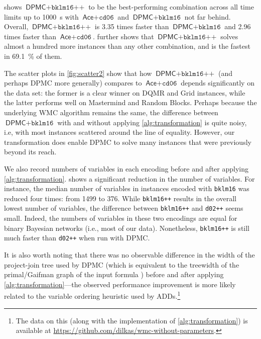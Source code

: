  shows $\textsf{DPMC}+\texttt{bklm16++}$ to be the
best-performing combination across all time limits up to \SI{1000}{\second} with
$\textsf{Ace} + \texttt{cd06}$ and $\textsf{DPMC}+\texttt{bklm16}$ not far
behind. Overall, $\textsf{DPMC}+\texttt{bklm16++}$ is 3.35 times faster than
$\textsf{DPMC}+\texttt{bklm16}$ and 2.96 times faster than
$\textsf{Ace}+\texttt{cd06}$.  further shows that
$\textsf{DPMC}+\texttt{bklm16++}$ solves almost a hundred more instances than
any other combination, and is the fastest in \SI{69.1}{\percent} of them.

The scatter plots in \cref{fig:scatter2} show that how $\textsf{DPMC} +
\texttt{bklm16++}$ (and perhaps \textsf{DPMC} more generally) compares to
$\textsf{Ace} + \texttt{cd06}$ depends significantly on the data set: the former
is a clear winner on DQMR and Grid instances, while the latter performs well on
Mastermind and Random Blocks. Perhaps because the underlying WMC algorithm
remains the same, the difference between $\textsf{DPMC} + \texttt{bklm16}$ with
and without applying \cref{alg:transformation} is quite noisy, i.e, with most
instances scattered around the line of equality. However, our transformation
does enable \textsf{DPMC} to solve many instances that were previously beyond
its reach.

We also record numbers of variables in each encoding before and after applying
\cref{alg:transformation}.  shows a significant reduction in the
number of variables. For instance, the median number of variables in instances
encoded with \texttt{bklm16} was reduced four times: from 1499 to 376. While
\texttt{bklm16++} results in the overall lowest number of variables, the
difference between \texttt{bklm16++} and \texttt{d02++} seems small. Indeed, the
numbers of variables in these two encodings are equal for binary Bayesian
networks (i.e., most of our data). Nonetheless, \texttt{bklm16++} is still much
faster than \texttt{d02++} when run with \textsf{DPMC}.

It is also worth noting that there was no observable difference in the width of
the project-join tree used by DPMC (which is equivalent to the treewidth of the
primal/Gaifman graph of the input formula \cite{DBLP:conf/cp/DudekPV20}) before
and after applying \cref{alg:transformation}---the observed performance
improvement is more likely related to the variable ordering heuristic used by
ADDs.\footnote{The data on this (along with the implementation of
  \cref{alg:transformation}) is available at
  \url{https://github.com/dilkas/wmc-without-parameters}.}

